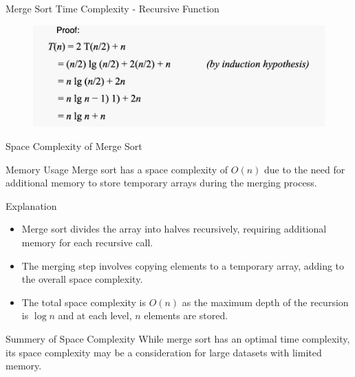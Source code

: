 \documentclass{beamer}
\begin{document}
\begin{frame}{Merge Sort Time Complexity - Recursive Function}
  \begin{figure}
    \centering
    \includegraphics[width=1\textwidth]{graphics/time.png}
  \end{figure}

\end{frame}
\begin{frame}{Space Complexity of Merge Sort}
  \begin{block}{Memory Usage}
    Merge sort has a space complexity of \(O(n)\) due to the need for additional memory to store temporary arrays during the merging process.
  \end{block}

  \begin{block}{Explanation}
    \begin{itemize}
      \item Merge sort divides the array into halves recursively, requiring additional memory for each recursive call.
      \item The merging step involves copying elements to a temporary array, adding to the overall space complexity.
      \item The total space complexity is \(O(n)\) as the maximum depth of the recursion is \(\log n\) and at each level, \(n\) elements are stored.
    \end{itemize}
  \end{block}

  \begin{block}{Summery of Space Complexity}
    While merge sort has an optimal time complexity, its space complexity may be a consideration for large datasets with limited memory.
  \end{block}
\end{frame}
\end{document}
